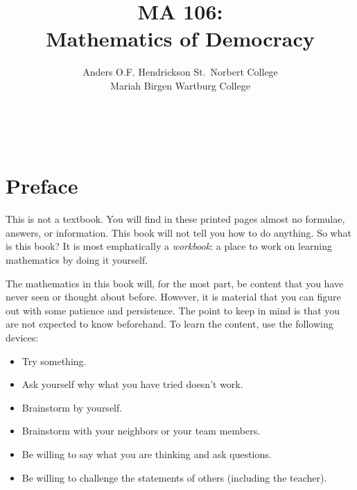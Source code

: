 \documentclass[12pt,leqno]{book}
\title{MA 106: \\ Mathematics of Democracy }
\author{Anders O.F. Hendrickson \qquad
        St.~Norbert College  \\
        Mariah Birgen \qquad
				Wartburg College}
\date{\theterm{} \theyear}
\begin{document}
\frontmatter
	\thispagestyle{empty}
	\vfill
	\maketitle
%
	\vfill
	\clearpage

\pagestyle{empty}
~\clearpage

		\thispagestyle{empty}
\tableofcontents*


\chapter*{Preface}\normalsize

This is not a textbook.
You will find in these printed pages almost no formulae, answers, or information.
This book will not tell you how to do anything.
So what is this book?
It is most emphatically a \emph{workbook}: a place to work on learning mathematics by doing it yourself.

The mathematics in this book will, for the most part, be content that you have never seen or thought about before.  However, it is material that you can figure out with some patience and persistence.  The point to keep in mind is that you are not expected to know beforehand.  To learn the content, use the following devices:
\begin{itemize}
	\item Try something.
	\item Ask yourself why what you have tried doesn't work.
	\item Brainstorm by yourself.
	\item Brainstorm with your neighbors or your team members.
	\item Be willing to say what you are thinking and ask questions.
	\item Be willing to challenge the statements of others (including the teacher).
\end{itemize}
\end{document}

